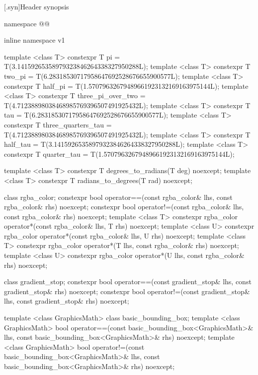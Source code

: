 [\iotwod.syn]{Header \tcode{<\iotwodheader{}>} synopsis}

\indexlibrary{\idxhdr{\iotwodheader{}}}%
%
\begin{codeblock}

namespace @\namespacenoinlinev{}@ {
  inline namespace v1 {
    template <class T>
    constexpr T pi = T(3.14159265358979323846264338327950288L);
    template <class T>
    constexpr T two_pi = T(6.28318530717958647692528676655900577L);
    template <class T>
    constexpr T half_pi = T(1.57079632679489661923132169163975144L);
    template <class T>
    constexpr T three_pi_over_two = T(4.71238898038468985769396507491925432L);
    template <class T>
    constexpr T tau = T(6.28318530717958647692528676655900577L);
    template <class T>
    constexpr T three_quarters_tau = T(4.71238898038468985769396507491925432L);
    template <class T>
    constexpr T half_tau = T(3.14159265358979323846264338327950288L);
    template <class T>
    constexpr T quarter_tau = T(1.57079632679489661923132169163975144L);
    
    template <class T>
    constexpr T degrees_to_radians(T deg) noexcept;
    template <class T>
    constexpr T radians_to_degrees(T rad) noexcept;

    class rgba_color;
    constexpr bool operator==(const rgba_color& lhs, const rgba_color& rhs) 
      noexcept;
    constexpr bool operator!=(const rgba_color& lhs, const rgba_color& rhs) 
      noexcept;
    template <class T>
    constexpr rgba_color operator*(const rgba_color& lhs, T rhs) noexcept;
    template <class U>
    constexpr rgba_color operator*(const rgba_color& lhs, U rhs) noexcept;
    template <class T>
    constexpr rgba_color operator*(T lhs, const rgba_color& rhs) noexcept;
    template <class U>
    constexpr rgba_color operator*(U lhs, const rgba_color& rhs) noexcept;
  
    class gradient_stop;
    constexpr bool operator==(const gradient_stop& lhs,
      const gradient_stop& rhs) noexcept;
    constexpr bool operator!=(const gradient_stop& lhs,
      const gradient_stop& rhs) noexcept;
  
    template <class GraphicsMath>
    class basic_bounding_box;
    template <class GraphicsMath>
    bool operator==(const basic_bounding_box<GraphicsMath>& lhs,
      const basic_bounding_box<GraphicsMath>& rhs) noexcept;
    template <class GraphicsMath>
    bool operator!=(const basic_bounding_box<GraphicsMath>& lhs,
      const basic_bounding_box<GraphicsMath>& rhs) noexcept;
  
}}
\end{codeblock}
